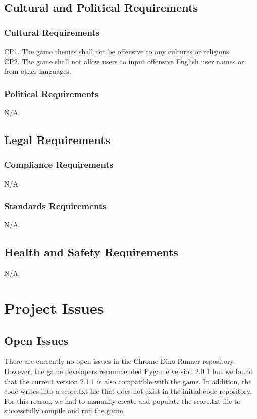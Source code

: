 \documentclass[12pt]{article}
\begin{document}
	\subsection{Cultural and Political Requirements}
	\subsubsection{Cultural Requirements}
	CP1. The game themes shall not be offensive to any cultures or religions. \\
	CP2. The game shall not allow users to input offensive English user names or from other languages.
	
	\subsubsection{Political Requirements}    N/A
	
	\subsection{Legal Requirements}
	\subsubsection{Compliance Requirements}
	N/A
	
	\subsubsection{Standards Requirements} 
	N/A
	
	\subsection{Health and Safety Requirements}
	N/A
	
	
	\section{Project Issues}
	\subsection{Open Issues}
	There are currently no open issues in the Chrome Dino Runner repository.
	However, the game developers recommended Pygame version 2.0.1 but we found that the current version 2.1.1 is also compatible with the game.
	In addition, the code writes into a score.txt file that does not exist in the initial code repository. For this reason, we had to manually create and populate the score.txt file to successfully compile and run the game.
\end{document}
